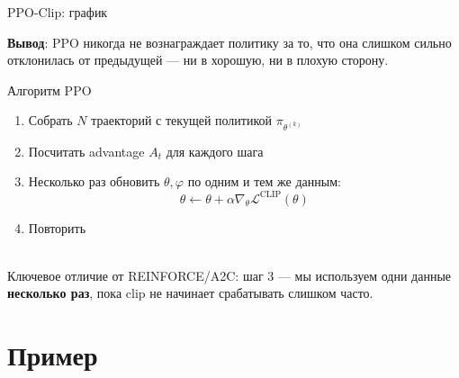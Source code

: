 \documentclass[aspectratio=169,12pt,t,compress]{beamer}
\begin{document}
\begin{frame}{PPO-Clip: график}

	\textbf{Вывод}: PPO никогда не вознаграждает политику за то, что она слишком сильно отклонилась от предыдущей --- ни в хорошую, ни в плохую сторону.
\end{frame}

\begin{frame}{Алгоритм PPO}
	\begin{enumerate}
		\item Собрать $N$ траекторий с текущей политикой $\pi_{\theta^{(k)}}$
		\item Посчитать advantage $A_t$ для каждого шага
		\item Несколько раз обновить $\theta, \varphi$ по одним и тем же данным:
		      $$
			      \theta \leftarrow \theta + \alpha \nabla_\theta \mathcal{L}^{\text{CLIP}}(\theta)
		      $$
		\item Повторить
	\end{enumerate}

	\\ [0.5em]

	Ключевое отличие от REINFORCE/A2C: шаг 3 --- мы используем одни данные \textbf{несколько раз}, пока clip не начинает срабатывать слишком часто.
\end{frame}


\section{Пример}




\end{document}
